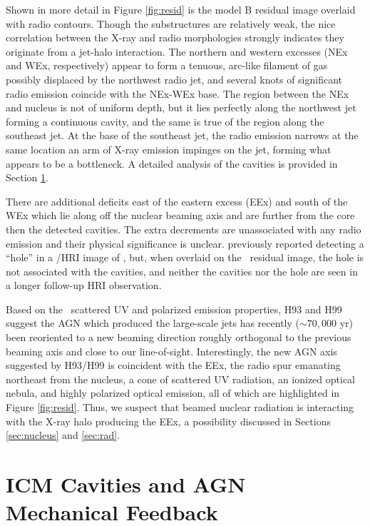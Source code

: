 \documentclass[referee,traditabstract]{aa}
\begin{document}
Shown in more detail in Figure \ref{fig:resid} is the model B residual
image overlaid with radio contours. Though the substructures are
relatively weak, the nice correlation between the X-ray and radio
morphologies strongly indicates they originate from a jet-halo
interaction. The northern and western excesses (NEx and WEx,
respectively) appear to form a tenuous, arc-like filament of gas
possibly displaced by the northwest radio jet, and several knots of
significant radio emission coincide with the NEx-WEx base. The region
between the NEx and nucleus is not of uniform depth, but it lies
perfectly along the northwest jet forming a continuous cavity, and the
same is true of the region along the southeast jet. At the base of the
southeast jet, the radio emission narrows at the same location an arm
of X-ray emission impinges on the jet, forming what appears to be a
bottleneck. A detailed analysis of the cavities is provided in Section
\ref{sec:cavs}.

There are additional deficits east of the eastern excess (EEx) and
south of the WEx which lie along off the nuclear beaming axis and are
further from the core then the detected cavities. The extra decrements
are unassociated with any radio emission and their physical
significance is unclear. \citet{1995MNRAS.274L..63F} previously
reported detecting a ``hole'' in a \rosat/HRI image of \irs, but, when
overlaid on the \cxo\ residual image, the hole is not associated with
the cavities, and neither the cavities nor the hole are seen in a
longer follow-up HRI observation.

Based on the \irs\ scattered UV and polarized emission properties, H93
and H99 suggest the AGN which produced the large-scale jets has
recently ($\sim 70,000$ yr) been reoriented to a new beaming direction
roughly orthogonal to the previous beaming axis and close to our
line-of-sight. Interestingly, the new AGN axis suggested by H93/H99 is
coincident with the EEx, the radio spur emanating northeast from the
nucleus, a cone of scattered UV radiation, an ionized optical nebula,
and highly polarized optical emission, all of which are highlighted in
Figure \ref{fig:resid}. Thus, we suspect that beamed nuclear radiation
is interacting with the X-ray halo producing the EEx, a possibility
discussed in Sections \ref{sec:nucleus} and \ref{sec:rad}.

\section{ICM Cavities and AGN Mechanical Feedback}
\label{sec:cavs}
\end{document}
